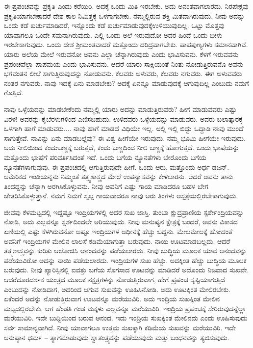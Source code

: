 ಈ ಪ್ರಪಂಚವನ್ನು ಪ್ರಕೃತಿ ಎಂದು ಕರೆಯಿರಿ. ಅದಕ್ಕೆ ಒಂದು ಮಿತಿ ಇರಬೇಕು. ಅದು ಅನಂತವಾಗಲಾರದು. ನಿರಪೇಕ್ಷವು ಪ್ರಕೃತಿಯಾಗಬೇಕಾದರೆ ದೇಶ ಕಾಲ ನಿಮಿತ್ತಕ್ಕೆ ಒಳಗಾಗಬೇಕು. ನಮ್ಮಲ್ಲಿರುವ ಶಕ್ತಿ ಮಿತವಾಗಿರುವುದು. ನೀವು ಅದನ್ನು ಒಂದು ಕಡೆ ಖರ್ಚುಮಾಡಿದರೆ, ಇನ್ನೊಂದು ಕಡೆ ಖರ್ಚುಮಾಡುವುದಕ್ಕೆ\break ಉಳಿಯುವುದಿಲ್ಲ. ಒಟ್ಟು ಮೊತ್ತವು ಯಾವಾಗಲೂ ಒಂದೇ ಸಮನಾಗಿರುವುದು. ಎಲ್ಲಿ ಒಂದು ಅಲೆ ಇರುವುದೋ ಅದರ ಹಿಂದೆ ಒಂದು ಬೀಳು ಇರಬೇಕಾಗುವುದು. ಒಂದು ದೇಶ ಶ‍್ರೀಮಂತವಾದರೆ ಮತ್ತೊಂದು ದರಿದ್ರವಾಗಬೇಕು. ಪಾಪಪುಣ್ಯಗಳು ಸಮಾನವಾಗಿವೆ. ಯಾರು ಅಲೆಯ ಮೇಲೆ ಇರುವನೋ ಅವನು ಎಲ್ಲಾ ಚೆನ್ನಾಗಿರುವುದು ಎಂದು ಭಾವಿಸುವನು. ಕೆಳಗೆ ಇರುವವನು ಪ್ರಪಂಚವೆಲ್ಲಾ ಪಾಪಮಯ ಎಂದು ಭಾವಿಸುವನು. ಆದರೆ ಯಾರು ಸಾಕ್ಷಿಯಂತೆ ನಿಂತು ನೋಡುತ್ತಿರುವನೊ ಅವನು ಭಗವಂತನ ಲೀಲೆ ಸಾಗುತ್ತಿರುವುದನ್ನು ನೋಡುವನು. ಕೆಲವರು ಅಳುವರು, ಕೆಲವರು ನಗುವರು. ಈಗ ಅಳುವವರು ನಂತರ ನಗುವರು. ನಾವು ಇದಕ್ಕೆ ಏನು ಮಾಡಬೇಕು? ಅದಕ್ಕೆ ಏನನ್ನೂ ಮಾಡುವುದಕ್ಕೆ ಆಗುವುದಿಲ್ಲ ಎಂಬುದು ನಮಗೆ ಗೊತ್ತಿದೆ.

ನಾವು ಒಳ್ಳೆಯದನ್ನು ಮಾಡಬೇಕೆಂದು ನಮ್ಮಲ್ಲಿ ಯಾರು ಅದನ್ನು ಮಾಡುತ್ತಿರುವರು? ಹೀಗೆ ಮಾಡುವವರು ಎಷ್ಟು ವಿರಳ! ಅವರನ್ನು ಕೈಬೆರಳುಗಳಿಂದ ಎಣಿಸಬಹುದು. ಉಳಿದವರು ಒಳ್ಳೆಯದನ್ನು ಮಾಡುವರು. ಅವರು ಬಲಾತ್ಕಾರಕ್ಕೆ ಒಳಗಾಗಿ ಹಾಗೆ ಮಾಡುವರು.... ನಾವು ಹಾಗೆ ಮಾಡದೆ ವಿಧಿಯೇ ಇಲ್ಲ. ಅಲ್ಲಿ ಇಲ್ಲಿ ಬಿದ್ದು ಒದ್ದಾಡಿ ನಾವು ಮುಂದೆ ಸಾಗುತ್ತೇವೆ. ನಾವಿನ್ನು ಏನು ಮಾಡಬಲ್ಲೆವು? ಈ ವಿಶ್ವ ಹೀಗೆಯೇ ಇರುವುದು. ನಮ್ಮ ಭೂಮಿ ಹೀಗೆಯೇ ಇರುವುದು. ಅದು ನೀಲಿಯಿಂದ ಕಂದುಬಣ್ಣಕ್ಕೆ ಬರುತ್ತದೆ, ಕಂದು ಬಣ್ಣದಿಂದ ನೀಲಿ ಬಣ್ಣಕ್ಕೆ ಹೋಗುತ್ತದೆ. ಒಂದು ಭಾಷೆಯನ್ನು ಮತ್ತೊಂದು ಭಾಷೆಗೆ ಪರಿವರ್ತಿಸಿದಂತೆ ಇದೆ. ಒಂದು ಬಗೆಯ ನ್ಯೂನತೆಗಳು ಬೇರೊಂದು ಬಗೆಯ ನ್ಯೂನತೆಗಳಾಗುವುವು. ಈ ಪ್ರಪಂಚದಲ್ಲಿ ಆಗುತ್ತಿರುವುದೇ ಹೀಗೆ. ಒಂದು ಆರು, ಮತ್ತೊಂದು ಅರ್ಧ ಡಜನ್. ಅಮೆರಿಕದ ಇಂಡಿಯನ್ನನು ನಿಮ್ಮಂತೆ ತತ್ತ್ವಶಾಸ್ತ್ರದ ಮೇಲೆ ಉಪನ್ಯಾಸವನ್ನು ಕೇಳಲಾರನು. ಆದರೆ ಅವನು ತಾನು ತಿಂದದ್ದನ್ನು ಚೆನ್ನಾಗಿ ಅರಗಿಸಿಕೊಳ್ಳುವನು. ನೀವು ಅವನಿಗೆ ಎಷ್ಟು ಗಾಯ ಮಾಡಿದರೂ ಬಹಳ ಬೇಗ ಚೇತರಿಸಿಕೊಳ್ಳುತ್ತಾನೆ. ನಮಗೆ ನಿಮಗೆ ಸ್ವಲ್ಪ ಗಾಯವಾದರೂ ನಾವು ಆರು ತಿಂಗಳು ಆಸ್ಪತ್ರೆಯಲ್ಲಿರಬೇಕಾಗುವುದು.

ಜೀವವು ಕೆಳಮಟ್ಟದಲ್ಲಿ ಇದ್ದಷ್ಟೂ ಇಂದ್ರಿಯಗಳಲ್ಲಿ ಅದರ ಸುಖ ಜಾಸ್ತಿ. ತುಂಬಾ ಕ್ಷುದ್ರಪ್ರಾಣಿಯ ಸ್ಪರ್ಶೇಂದ್ರಿಯವನ್ನು ನೋಡಿ, ಅದು ಎಲ್ಲವನ್ನೂ ಸ್ಪರ್ಶದಿಂದಲೇ ಅರಿಯುವುದು. ನೀವು ಮನುಷ್ಯನ ಕ್ಷೇತ್ರಕ್ಕೆ ಬಂದರೆ, ಅವನು ವಿಕಾಸದ ಏಣಿಯಲ್ಲಿ ಎಷ್ಟು ಕೆಳಗಿರುವನೋ ಅಷ್ಟೂ ಇಂದ್ರಿಯಗಳ ಅಧೀನಕ್ಕೆ ಹೆಚ್ಚು ಬದ್ದನು. ಮೇಲಮೇಲಕ್ಕೆ ಹೋದಂತೆ ಅವನಿಗೆ ಇಂದ್ರಿಯಗಳ ಮೇಲಿನ ಲಾಲಸೆ ಕಡಿಮೆಯಾಗುತ್ತಾ ಬರುವುದು. ನಾಯಿ ಊಟಮಾಡಬಲ್ಲದು. ಆದರೆ ತತ್ತ್ವಶಾಸ್ತ್ರವನ್ನು ಕುರಿತು ಆಲೋಚಿಸಿ ಆನಂದವನ್ನು ಪಡೆಯಲಾರದು. ನೀವು ಬುದ್ಧಿಯ ಮೂಲಕ ಯಾವ ಆನಂದವನ್ನು ಪಡೆಯುವಿರೋ ಅದನ್ನು ನಾಯಿ ಪಡೆಯಲಾರದು. ಇಂದ್ರಿಯಗಳ ಸುಖ ಹೆಚ್ಚು. ಅದಕ್ಕಿಂತ ಹೆಚ್ಚು ಬುದ್ಧಿಯ ಮೂಲಕ ಬರುವುದು. ನೀವು ಪ್ಯಾರಿಸ್ಸಿನಲ್ಲಿ ಐವತ್ತು ಬಗೆಯ ಸೊಗಸಾದ ಊಟವನ್ನು ಮಾಡಿದರೆ ಅದೊಂದು ನಿಜವಾದ ಸುಖವೇ. ಆದರೆ\break ದೂರದರ್ಶಕ ಯಂತ್ರದ ಮೂಲಕ ನಕ್ಷತ್ರಗಳನ್ನು ನೋಡುತ್ತಿರುವಾಗ, ಹೇಗೆ ಪ್ರಪಂಚ ಸೃಷ್ಟಿಯಾಗುತ್ತಿದೆ ಎಂಬುದನ್ನು ನೋಡಿದಾಗ, ಅದರಿಂದ ಆಗುವ ಸುಖವನ್ನು ಊಹಿಸಿನೋಡಿ. ಅದು ಊಟಕ್ಕಿಂತ ಮೇಲಿರಬೇಕು. ಏಕೆಂದರೆ ಅದನ್ನು ನೋಡುತ್ತಿರುವಾಗ ಊಟವನ್ನೂ ಮರೆಯುವಿರಿ. ಅದು ಇಂದ್ರಿಯ ಸುಖಕ್ಕಿಂತ ಮೇಲಿನ ಮಟ್ಟದಲ್ಲಿರಬೇಕು. ಆಗ ಹೆಂಡತಿ ಗಂಡ ಮಕ್ಕಳು ಎಲ್ಲವನ್ನೂ ಮರೆಯುವಿರಿ. ಇಂದ್ರಿಯ ಪ್ರಪಂಚಕ್ಕೆ ಸೇರಿರುವುದನ್ನೆಲ್ಲಾ ಮರೆಯುವಿರಿ. ಇದೇ ಬುದ್ದಿಯಿಂದ ಬರುವ ಆನಂದ. ಇದು ಇಂದ್ರಿಯ ಸುಖಕ್ಕಿಂತ ಮೇಲಿನದು ಎಂದು ಊಹಿಸುವುದು ಸರ್ವ ಸಾಮಾನ್ಯವಾಗಿದೆ. ನೀವು ಯಾವಾಗಲೂ ಉತ್ತಮ ಸುಖಕ್ಕಾಗಿ ಕಡಿಮೆಯ ಸುಖವನ್ನು ಮರೆಯುವಿರಿ. ಇದೇ ಅನುಷ್ಠಾನ ಧರ್ಮ – ತ್ಯಾಗಮಾಡುವುದು ಸ್ವಾತಂತ್ರ್ಯವನ್ನು ಪಡೆಯುವುದು ಮತ್ತು ಬಂಧನವನ್ನು ತ್ಯಜಿಸುವುದು.

